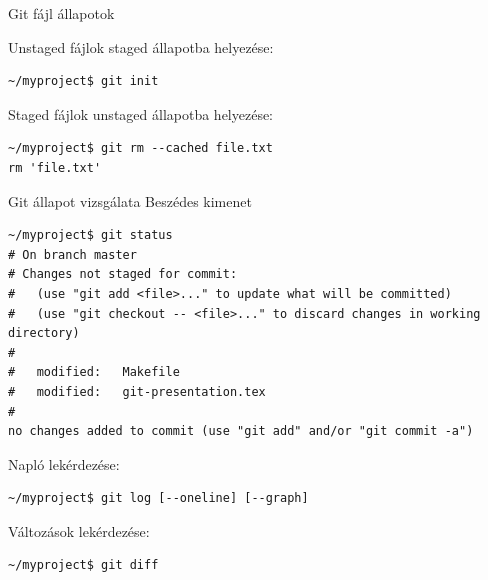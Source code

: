 \documentclass[display,t]{beamer}
\begin{document}
\begin{frame}[fragile]{Git fájl állapotok}
    \pause
    \begin{center}
    \end{center}
    
    \pause
    Unstaged fájlok staged állapotba helyezése:
\begin{verbatim}
~/myproject$ git init
\end{verbatim}

    \pause
    Staged fájlok unstaged állapotba helyezése:
\begin{verbatim}
~/myproject$ git rm --cached file.txt
rm 'file.txt'
\end{verbatim}
\end{frame}

\begin{frame}[fragile]{Git állapot vizsgálata}
    Beszédes kimenet
    \tiny
\begin{verbatim}
~/myproject$ git status
# On branch master
# Changes not staged for commit:
#   (use "git add <file>..." to update what will be committed)
#   (use "git checkout -- <file>..." to discard changes in working directory)
#
#	modified:   Makefile
#	modified:   git-presentation.tex
#
no changes added to commit (use "git add" and/or "git commit -a")
\end{verbatim}

    Napló lekérdezése:
\begin{verbatim}
~/myproject$ git log [--oneline] [--graph]
\end{verbatim}

    Változások lekérdezése:
\begin{verbatim}
~/myproject$ git diff
\end{verbatim}
\end{frame}
\end{document}
